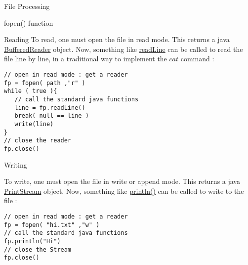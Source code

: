 \begin{section}{File Processing}
\begin{subsection}{fopen() function}
\end{subsection}

\begin{subsection}{Reading}
To read, one must open the file in read mode.
This returns a java \href{https://docs.oracle.com/javase/8/docs/api/java/io/BufferedReader.html}{BufferedReader} object.
Now, something like \href{https://docs.oracle.com/javase/8/docs/api/java/io/BufferedReader.html#readLine--}{readLine}
can be called to read the file line by line, in a traditional way to implement the $cat$ command : 

\begin{center}\begin{minipage}{\linewidth}
\begin{lstlisting}[style=JexlStyle]
// open in read mode : get a reader
fp = fopen( path ,"r" )
while ( true ){
   // call the standard java functions
   line = fp.readLine()
   break( null == line )
   write(line)
}
// close the reader
fp.close()
\end{lstlisting}
\end{minipage}\end{center}

\end{subsection}

\begin{subsection}{Writing}

To write, one must open the file in write or append mode.
This returns a java \href{https://docs.oracle.com/javase/8/docs/api/java/io/PrintStream.html}{PrintStream} object.
Now, something like \href{https://docs.oracle.com/javase/8/docs/api/java/io/PrintStream.html#println-java.lang.Object-}{println()}
can be called to write to the file :

\begin{lstlisting}[style=JexlStyle]
// open in read mode : get a reader
fp = fopen( "hi.txt" ,"w" )
// call the standard java functions
fp.println("Hi")
// close the Stream
fp.close()
\end{lstlisting}

\end{subsection}

\end{section}

